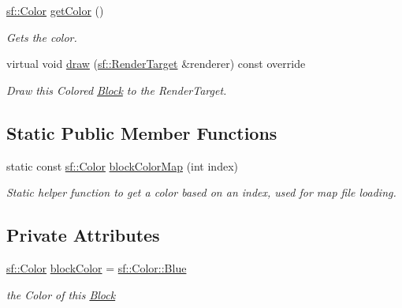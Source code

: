 \begin{DoxyCompactItemize}
\mbox{\hyperlink{classsf_1_1_color}{sf\+::\+Color}} \mbox{\hyperlink{class_colored_block_aafdbed32b7e76c5735a25c3bccc81acc}{get\+Color}} ()
\begin{DoxyCompactList}\small\item\em Gets the color. \end{DoxyCompactList}\item 
virtual void \mbox{\hyperlink{class_colored_block_a406ca632f6b5a45b8f88de0ba3ab9b43}{draw}} (\mbox{\hyperlink{classsf_1_1_render_target}{sf\+::\+Render\+Target}} \&renderer) const override
\begin{DoxyCompactList}\small\item\em Draw this Colored \mbox{\hyperlink{class_block}{Block}} to the Render\+Target. \end{DoxyCompactList}\end{DoxyCompactItemize}
\subsection*{Static Public Member Functions}
\begin{DoxyCompactItemize}
\item 
static const \mbox{\hyperlink{classsf_1_1_color}{sf\+::\+Color}} \mbox{\hyperlink{class_colored_block_a5d6dd29a50e87b370ebb66faf9d904b6}{block\+Color\+Map}} (int index)
\begin{DoxyCompactList}\small\item\em Static helper function to get a color based on an index, used for map file loading. \end{DoxyCompactList}\end{DoxyCompactItemize}
\subsection*{Private Attributes}
\begin{DoxyCompactItemize}
\item 
\mbox{\label{class_colored_block_a43b65f7cce7256045bb348100e9bfa13}} 
\mbox{\hyperlink{classsf_1_1_color}{sf\+::\+Color}} \mbox{\hyperlink{class_colored_block_a43b65f7cce7256045bb348100e9bfa13}{block\+Color}} = \mbox{\hyperlink{classsf_1_1_color_ab03770d4817426b2614cfc33cf0e245c}{sf\+::\+Color\+::\+Blue}}
\begin{DoxyCompactList}\small\item\em the Color of this \mbox{\hyperlink{class_block}{Block}} \end{DoxyCompactList}\end{DoxyCompactItemize}
